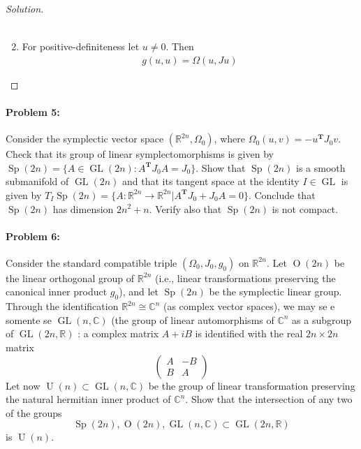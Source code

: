 \begin{proof}[Solution]
\begin{enumerate}
\begin{align*}
			\end{align*}

		\item For positive-definiteness let $u\neq 0$. Then
			\begin{align*}
				g(u,u)=\Omega(u,Ju)
			\end{align*}
	\end{enumerate}

\end{proof}

 \paragraph{Problem 5:} Consider the symplectic vector space $(\mathbb{R}^{2n},\Omega_0)$, where $\Omega_0(u,v)=-u^{\mathbf{T}} J_0v$. Check that its group of linear symplectomorphisms is given by $\operatorname{Sp}(2n)=\{A\in \operatorname{GL}(2n):A^{\mathbf{T}}J_0A=J_0\}.$ Show that $\operatorname{Sp}(2n)$ is a smooth submanifold of $\operatorname{GL}(2n)$ and that its tangent space at the identity $I\in \operatorname{GL}$ is given by $T_{I}\operatorname{Sp}(2n)=\{A:\mathbb{R}^{2n}\to \mathbb{R}^{2n}|A^{\mathbf{T}} J_0+J_0A=0\} $. Conclude that $\operatorname{Sp}(2n)$ has dimension $2n^{2} +n$. Verify also that $\operatorname{Sp}(2n)$ is not compact.

 \paragraph{Problem 6:} Consider the standard compatible triple $(\Omega_0,J_0,g_0)$ on $\mathbb{R}^{2n}$. Let $\operatorname{O}(2n)$ be the linear orthogonal group of $\mathbb{R}^{2n}$ (i.e., linear transformations preserving the canonical inner product $g_0$), and let $\operatorname{Sp}(2n)$ be the symplectic linear group. Through the identification $\mathbb{R}^{2n}\cong \mathbb{C}^{n}$ (as complex vector spaces), we may se e somente se $\operatorname{GL}(n,\mathbb{C})$ (the group of linear automorphisms of $\mathbb{C}^{n}$ as a subgroup of $\operatorname{GL}(2n,\mathbb{R})$ : a complex matrix $A+iB$ is identified with the real $2n\times 2n$ matrix
 \[\begin{pmatrix}A&-B\\B&A\end{pmatrix}\]
Let now $\operatorname{U}(n)\subset\operatorname{GL}(n,\mathbb{C})$ be the group of linear transformation preserving the natural hermitian inner product of $\mathbb{C}^{n}$. Show that the intersection of any two of the groups
\[\operatorname{Sp}(2n),\operatorname{O}(2n),\operatorname{GL}(n,\mathbb{C})\subset\operatorname{GL}(2n,\mathbb{R})\]
is $\operatorname{U}(n)$.

